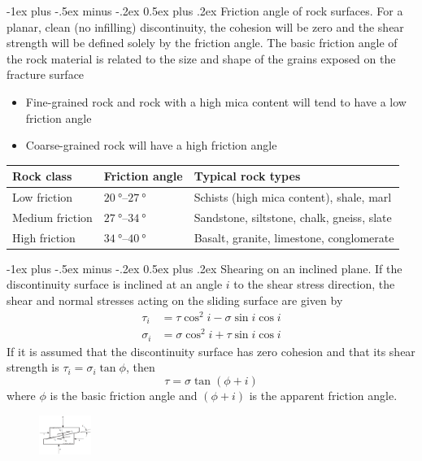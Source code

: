 \documentclass[10pt,landscape,a4paper]{article}
\makeatletter
\renewcommand{\section}{\@startsection{section}{1}{0mm}%
	{-1ex plus -.5ex minus -.2ex}%
	{0.5ex plus .2ex}%
	{\normalfont\large\bfseries}}
\makeatother
\begin{document}
\begin{multicols}{3}
	\section{Friction angle of rock surfaces.}
	For a planar, clean (no infilling) discontinuity, the cohesion will be zero and the shear strength will be defined solely by the friction angle.
	The basic friction angle of the rock material is related to the size and shape of the grains exposed on the fracture surface
	\begin{itemize}
		\item Fine-grained rock and rock with a high mica content will tend to have a low friction angle
		\item Coarse-grained rock will have a high friction angle
	\end{itemize}
	\begin{table}[H]\scriptsize\centering\begin{tabular}{lll}
			Rock class      & Friction angle              & Typical rock types                         \\
			\hline
			Low friction    & $\SIrange{20}{27}{\degree}$ & Schists (high mica content), shale, marl   \\
			Medium friction & $\SIrange{27}{34}{\degree}$ & Sandstone, siltstone, chalk, gneiss, slate \\
			High friction   & $\SIrange{34}{40}{\degree}$ & Basalt, granite, limestone, conglomerate
		\end{tabular}\end{table}
	
	\section{Shearing on an inclined plane.}
	If the discontinuity surface is inclined at an angle $i$ to the shear stress direction, the shear and normal stresses acting on the sliding surface are given by
	\begin{align*}
		\tau_i   & =\tau\cos^2i-\sigma\sin i\cos i \\
		\sigma_i & =\sigma\cos^2i+\tau\sin i\cos i
	\end{align*}
	If it is assumed that the discontinuity surface has zero cohesion and that its shear strength is $\tau_i=\sigma_i\tan\phi$, then
	\[
		\tau=\sigma\tan(\phi+i)
	\]
	where $\phi$ is the basic friction angle and $(\phi+i)$ is the apparent friction angle.
	\begin{figure}[H]
		\centering
		\includegraphics[width=0.15\textwidth]{shearing-inclined-plane}
	\end{figure}
	

\end{multicols}
\end{document}
